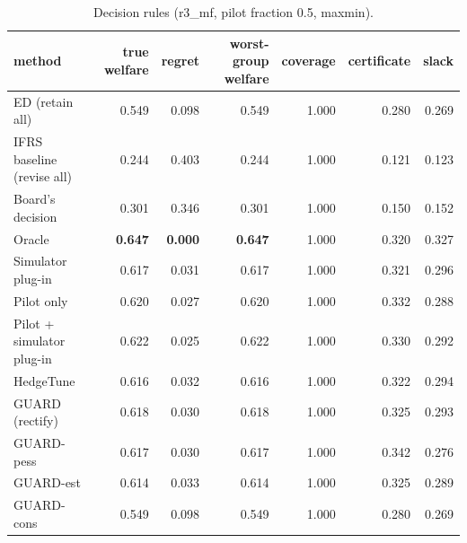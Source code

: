 \begin{table}[t]
\centering
\small
\begin{tabular}{lrrrrrr}
\toprule
method & true welfare & regret & worst-group welfare & coverage & certificate & slack \\
\midrule
ED (retain all) & 0.549 & 0.098 & 0.549 & 1.000 & 0.280 & 0.269 \\
IFRS baseline (revise all) & 0.244 & 0.403 & 0.244 & 1.000 & 0.121 & 0.123 \\
Board's decision & 0.301 & 0.346 & 0.301 & 1.000 & 0.150 & 0.152 \\
Oracle & \textbf{0.647} & \textbf{0.000} & \textbf{0.647} & 1.000 & 0.320 & 0.327 \\
Simulator plug-in & 0.617 & 0.031 & 0.617 & 1.000 & 0.321 & 0.296 \\
Pilot only & 0.620 & 0.027 & 0.620 & 1.000 & 0.332 & 0.288 \\
Pilot + simulator plug-in & 0.622 & 0.025 & 0.622 & 1.000 & 0.330 & 0.292 \\
HedgeTune & 0.616 & 0.032 & 0.616 & 1.000 & 0.322 & 0.294 \\
GUARD (rectify) & 0.618 & 0.030 & 0.618 & 1.000 & 0.325 & 0.293 \\
GUARD-pess & 0.617 & 0.030 & 0.617 & 1.000 & 0.342 & 0.276 \\
GUARD-est & 0.614 & 0.033 & 0.614 & 1.000 & 0.325 & 0.289 \\
GUARD-cons & 0.549 & 0.098 & 0.549 & 1.000 & 0.280 & 0.269 \\
\bottomrule
\end{tabular}
\caption{Decision rules (r3\_mf, pilot fraction 0.5, maxmin).}
\label{tab:methods-maxmin}
\end{table}

